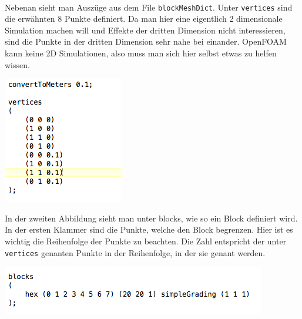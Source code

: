 \begin{refsection}
\begin{minipage}{\linewidth}
 \\
\end{minipage}
 \begin{minipage}{0.5 \linewidth}
Nebenan sieht man Auszüge aus dem File \texttt{blockMeshDict}. Unter \texttt{vertices} sind die erwähnten 8 Punkte definiert. Da man hier eine eigentlich 2 dimensionale Simulation machen will und Effekte der dritten Dimension nicht interessieren, sind die Punkte in der dritten Dimension sehr nahe bei einander. OpenFOAM kann keine 2D Simulationen, also muss man sich hier selbst etwas zu helfen wissen. 
\end{minipage}
\begin{minipage}{0.5 \linewidth}
\hspace{0.5 cm}
\includegraphics[width = 0.5 \linewidth]{./OpenFOAM/Pics/Punkte.png}
\end{minipage}
\begin{minipage}{0.5 \linewidth}
In der zweiten Abbildung sieht man unter blocks, wie so ein Block definiert wird. In der ersten Klammer sind die Punkte, welche den Block begrenzen. Hier ist es wichtig die Reihenfolge der Punkte zu beachten. Die Zahl entspricht der unter \texttt{vertices} genanten Punkte in der Reihenfolge, in der sie genant werden. 
\end{minipage}
\begin{minipage}{0.5 \linewidth}
\hspace{0.5 cm}
\includegraphics[width =  \linewidth]{./OpenFOAM/Pics/Blocks.png}
\end{minipage}

\end{refsection}
